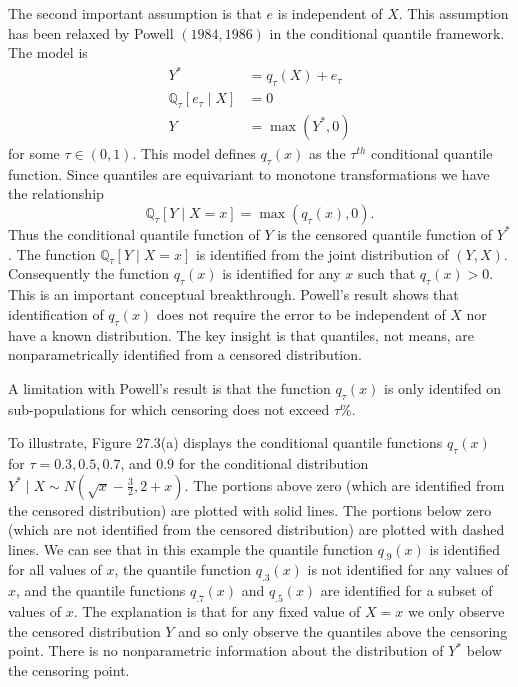 \documentclass[10pt]{article}
\begin{document}
The second important assumption is that $e$ is independent of $X$. This assumption has been relaxed by Powell $(1984,1986)$ in the conditional quantile framework. The model is
$$
\begin{aligned}
Y^{*} &=q_{\tau}(X)+e_{\tau} \\
\mathbb{Q}_{\tau}\left[e_{\tau} \mid X\right] &=0 \\
Y &=\max \left(Y^{*}, 0\right)
\end{aligned}
$$
for some $\tau \in(0,1)$. This model defines $q_{\tau}(x)$ as the $\tau^{t h}$ conditional quantile function. Since quantiles are equivariant to monotone transformations we have the relationship
$$
\mathbb{Q}_{\tau}[Y \mid X=x]=\max \left(q_{\tau}(x), 0\right) .
$$
Thus the conditional quantile function of $Y$ is the censored quantile function of $Y^{*}$. The function $\mathbb{Q}_{\tau}[Y \mid X=x]$ is identified from the joint distribution of $(Y, X)$. Consequently the function $q_{\tau}(x)$ is identified for any $x$ such that $q_{\tau}(x)>0$. This is an important conceptual breakthrough. Powell's result shows that identification of $q_{\tau}(x)$ does not require the error to be independent of $X$ nor have a known distribution. The key insight is that quantiles, not means, are nonparametrically identified from a censored distribution.

A limitation with Powell's result is that the function $q_{\tau}(x)$ is only identifed on sub-populations for which censoring does not exceed $\tau \%$.

To illustrate, Figure 27.3(a) displays the conditional quantile functions $q_{\tau}(x)$ for $\tau=0.3,0.5,0.7$, and $0.9$ for the conditional distribution $Y^{*} \mid X \sim N\left(\sqrt{x}-\frac{3}{2}, 2+x\right)$. The portions above zero (which are identified from the censored distribution) are plotted with solid lines. The portions below zero (which are not identified from the censored distribution) are plotted with dashed lines. We can see that in this example the quantile function $q_{.9}(x)$ is identified for all values of $x$, the quantile function $q_{.3}(x)$ is not identified for any values of $x$, and the quantile functions $q_{.7}(x)$ and $q_{.5}(x)$ are identified for a subset of values of $x$. The explanation is that for any fixed value of $X=x$ we only observe the censored distribution $Y$ and so only observe the quantiles above the censoring point. There is no nonparametric information about the distribution of $Y^{*}$ below the censoring point.
\end{document}
